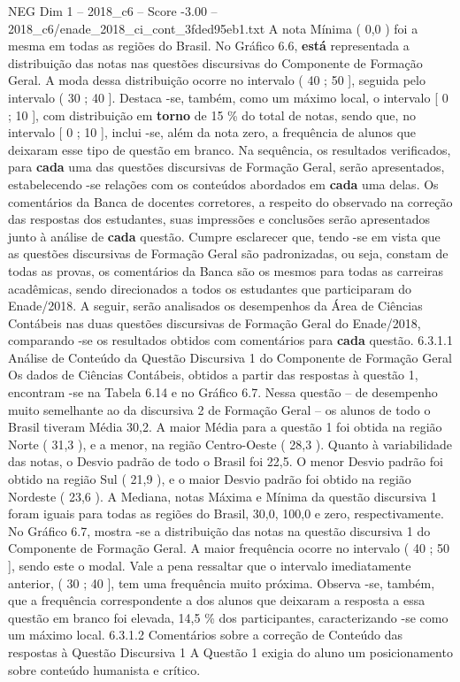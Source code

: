\begin{textsample}{NEG Dim 1 – 2018\_c6 – Score -3.00 – 2018\_c6/enade\_2018\_ci\_cont\_3fded95eb1.txt}
A nota Mínima ( 0,0 ) foi a mesma em todas as regiões do Brasil.
No Gráfico 6.6, \textbf{está} representada a distribuição das notas nas questões discursivas do Componente de Formação Geral.
A moda dessa distribuição ocorre no intervalo ( 40 ; 50 ], seguida pelo intervalo ( 30 ; 40 ].
Destaca -se, também, como um máximo local, o intervalo [ 0 ; 10 ], com distribuição em \textbf{torno} de 15 \% do total de notas, sendo que, no intervalo [ 0 ; 10 ], inclui -se, além da nota zero, a frequência de alunos que deixaram esse tipo de questão em branco.
Na sequência, os resultados verificados, para \textbf{cada} uma das questões discursivas de Formação Geral, serão apresentados, estabelecendo -se relações com os conteúdos abordados em \textbf{cada} uma delas.
Os comentários da Banca de docentes corretores, a respeito do observado na correção das respostas dos estudantes, suas impressões e conclusões serão apresentados junto à análise de \textbf{cada} questão.
Cumpre esclarecer que, tendo -se em vista que as questões discursivas de Formação Geral são padronizadas, ou seja, constam de todas as provas, os comentários da Banca são os mesmos para todas as carreiras acadêmicas, sendo direcionados a todos os estudantes que participaram do Enade/2018.
A seguir, serão analisados os desempenhos da Área de Ciências Contábeis nas duas questões discursivas de Formação Geral do Enade/2018, comparando -se os resultados obtidos com comentários para \textbf{cada} questão. 6.3.1.1 Análise de Conteúdo da Questão Discursiva 1 do Componente de Formação Geral Os dados de Ciências Contábeis, obtidos a partir das respostas à questão 1, encontram -se na Tabela 6.14 e no Gráfico 6.7.
Nessa questão – de desempenho muito semelhante ao da discursiva 2 de Formação Geral – os alunos de todo o Brasil tiveram Média 30,2.
A maior Média para a questão 1 foi obtida na região Norte ( 31,3 ), e a menor, na região Centro-Oeste ( 28,3 ).
Quanto à variabilidade das notas, o Desvio padrão de todo o Brasil foi 22,5.
O menor Desvio padrão foi obtido na região Sul ( 21,9 ), e o maior Desvio padrão foi obtido na região Nordeste ( 23,6 ).
A Mediana, notas Máxima e Mínima da questão discursiva 1 foram iguais para todas as regiões do Brasil, 30,0, 100,0 e zero, respectivamente.
No Gráfico 6.7, mostra -se a distribuição das notas na questão discursiva 1 do Componente de Formação Geral.
A maior frequência ocorre no intervalo ( 40 ; 50 ], sendo este o modal.
Vale a pena ressaltar que o intervalo imediatamente anterior, ( 30 ; 40 ], tem uma frequência muito próxima.
Observa -se, também, que a frequência correspondente a dos alunos que deixaram a resposta a essa questão em branco foi elevada, 14,5 \% dos participantes, caracterizando -se como um máximo local. 6.3.1.2 Comentários sobre a correção de Conteúdo das respostas à Questão Discursiva 1 A Questão 1 exigia do aluno um posicionamento sobre conteúdo humanista e crítico.

\end{textsample}
